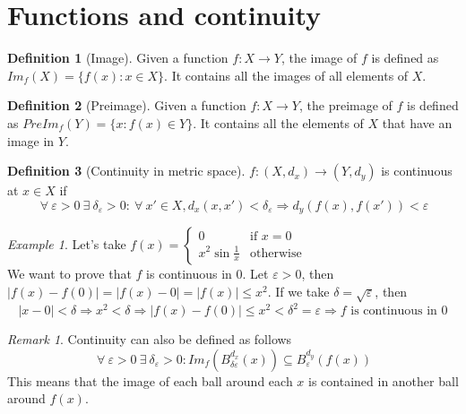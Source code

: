 \documentclass{article}
\newcommand{\DS}{\displaystyle}
\newcommand{\abs}[1]{\left|#1\right|}
\newcommand{\Ar}{\Rightarrow}
\newcommand{\fr}[2]{\frac{#1}{#2}}
\newcommand{\f}[3]{#1 : #2 \rightarrow #3}
\theoremstyle{definition}
\newtheorem{definition}{Definition}[section]
\theoremstyle{definition}
\theoremstyle{plain}
\theoremstyle{plain}
\theoremstyle{plain}
\theoremstyle{plain}
\theoremstyle{definition}
\theoremstyle{remark}
\newtheorem{exampled}{Example}[definition]
\theoremstyle{remark}
\theoremstyle{remark}
\theoremstyle{remark}
\newtheorem*{remark}{Remark}
\newcommand{\ForAll}{\ \forall \ }
\newcommand{\Exists}{\ \exists \ }
\newcommand{\E}{\varepsilon}
\begin{document}
\newpage
\section{Functions and continuity}


\begin{definition}[Image]
  Given a function $\f{f}{X}{Y}$, the image of $f$ is defined as $Im_f(X) = \{ f(x) : x \in X \}$. It contains all the images of all elements of $X$.
\end{definition}


\begin{definition}[Preimage]
  Given a function $\f{f}{X}{Y}$, the preimage of $f$ is defined as $PreIm_f(Y) = \{ x : f(x) \in Y \}$. It contains all the elements of $X$ that have an image in $Y$.
\end{definition}


\begin{definition}[Continuity in metric space]
  $\f{f}{(X,d_x)}{(Y,d_y)}$ is continuous at $x \in X$ if
  \[
    \ForAll \E > 0 \Exists \delta_\E > 0 : \ForAll x' \in X,
    d_x(x,x') < \delta_\E \Ar d_y(f(x),f(x')) < \E
  \]
\end{definition}

\begin{exampled}
  Let's take $\DS f(x) = \begin{cases} 0 & \text{if } x = 0 \\ x^2 \sin\fr{1}{x} & \text{otherwise} \end{cases}$\\
  We want to prove that $f$ is continuous in 0. Let $\E > 0$, then $\abs{f(x) - f(0)} = \abs{f(x) - 0} = \abs{f(x)} \leq x^2$. If we take $\delta = \sqrt{\E}$, then
  \[
    \abs{x - 0} < \delta \Ar x^2 < \delta \Ar \abs{f(x) - f(0)}
    \leq x^2 < \delta^2 = \E \Ar f \text{ is continuous in 0}
  \]
\end{exampled}

\begin{remark}
  Continuity can also be defined as follows
  \[
    \ForAll \E > 0 \Exists \delta_\E > 0 :
    Im_f(B_{\delta\E}^{d_x}(x)) \subseteq B_\E^{d_y}(f(x))
  \]
  This means that the image of each ball around each $x$ is contained in another ball around $f(x)$.
\end{remark}
\end{document}
